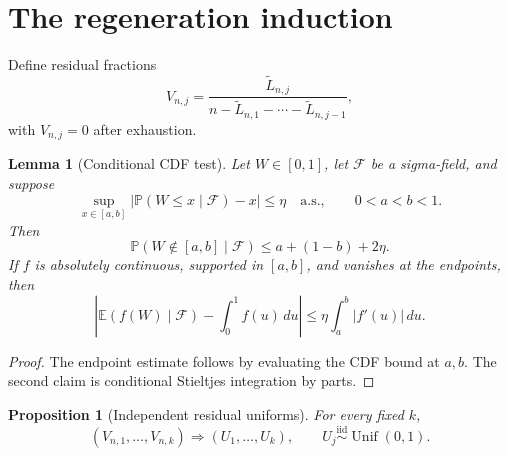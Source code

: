 \documentclass[11pt]{article}
\newtheorem{proposition}[theorem]{Proposition}
\newtheorem{lemma}[theorem]{Lemma}
\theoremstyle{definition}
\theoremstyle{remark}
\newcommand{\Pp}{\mathbb P}
\newcommand{\Ee}{\mathbb E}
\newcommand{\Unif}{\operatorname{Unif}}
\newcommand{\dd}{\,d}
\begin{document}
\section{The regeneration induction}
\label{sec:regeneration}

Define residual fractions
\begin{equation}
 V_{n,j}=\frac{\widetilde L_{n,j}}
 {n-\widetilde L_{n,1}-\cdots-\widetilde L_{n,j-1}},
 \label{eq:residual-fractions}
\end{equation}
with $V_{n,j}=0$ after exhaustion.

\begin{lemma}[Conditional CDF test]
\label{lem:cdf-test}
Let $W\in[0,1]$, let $\mathscr F$ be a sigma-field, and suppose
\[
 \sup_{x\in[a,b]}|\Pp(W\le x\mid\mathscr F)-x|\le\eta
 \quad\text{a.s.},
 \qquad 0<a<b<1.
\]
Then
\[
 \Pp(W\notin[a,b]\mid\mathscr F)\le a+(1-b)+2\eta.
\]
If $f$ is absolutely continuous, supported in $[a,b]$, and vanishes at the
endpoints, then
\[
 \left|\Ee(f(W)\mid\mathscr F)-\int_0^1f(u)\dd u\right|
 \le\eta\int_a^b|f'(u)|\dd u.
\]
\end{lemma}

\begin{proof}
The endpoint estimate follows by evaluating the CDF bound at $a,b$.  The second
claim is conditional Stieltjes integration by parts.
\end{proof}

\begin{proposition}[Independent residual uniforms]
\label{prop:residual-uniforms}
For every fixed $k$,
\begin{equation}
  (V_{n,1},\ldots,V_{n,k})
  \Rightarrow(U_1,\ldots,U_k),
  \qquad U_j\stackrel{\mathrm{iid}}\sim\Unif(0,1).
  \label{eq:finite-uniforms}
\end{equation}
\end{proposition}
\end{document}
